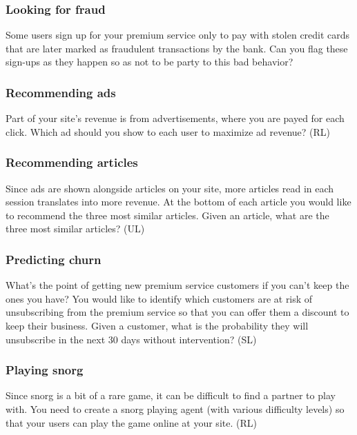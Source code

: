 \documentclass{article}
\begin{document}
\subsubsection{Looking for fraud}

Some users sign up for your premium service only to pay with stolen credit cards that are later marked as fraudulent transactions by the bank. Can you flag these sign-ups as they happen so as not to be party to this bad behavior?

\subsubsection{Recommending ads}

Part of your site's revenue is from advertisements, where you are payed for each click. Which ad should you show to each user to maximize ad revenue? (RL)

\subsubsection{Recommending articles}

Since ads are shown alongside articles on your site, more articles read in each session translates into more revenue. At the bottom of each article you would like to recommend the three most similar articles. Given an article, what are the three most similar articles? (UL)

\subsubsection{Predicting churn}

What's the point of getting new premium service customers if you can't keep the ones you have? You would like to identify which customers are at risk of unsubscribing from the premium service so that you can offer them a discount to keep their business. Given a customer, what is the probability they will unsubscribe in the next 30 days without intervention? (SL)

\subsubsection{Playing snorg}

Since snorg is a bit of a rare game, it can be difficult to find a partner to play with. You need to create a snorg playing agent (with various difficulty levels) so that your users can play the game online at your site. (RL)
\end{document}
